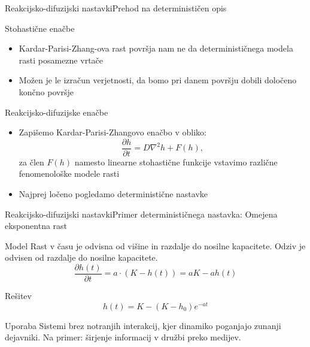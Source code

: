 \documentclass{beamer}
\begin{document}

\begin{frame}{Reakcijsko-difuzijski nastavki}{Prehod na determinističen opis}
\begin{block}{Stohastične enačbe}
  \begin{itemize}
  \item
    Kardar-Parisi-Zhang-ova rast površja nam ne da determinističnega modela rasti posamezne vrtače
  \item
    Možen je le izračun verjetnosti, da bomo pri danem površju dobili določeno končno površje
  \end{itemize}
\end{block}
\begin{block}{Reakcijsko-difuzijske enačbe}
  \begin{itemize}
  \item
    Zapišemo Kardar-Parisi-Zhangovo enačbo v obliko:
    \begin{equation} \frac{ \partial h}{ \partial t} = D \nabla^2 h + F(h), \end{equation}
    za člen $F(h)$ namesto linearne stohastične funkcije vstavimo različne fenomenološke modele rasti
  \item
    Najprej ločeno pogledamo deterministične nastavke
  \end{itemize}
\end{block}
\end{frame}


\begin{frame}{Reakcijsko-difuzijski nastavki}{Primer determinističnega nastavka: Omejena eksponentna rast}
\begin{block}{Model}
  Rast v času je odvisna od višine in razdalje do nosilne kapacitete. Odziv je odvisen od razdalje do nosilne kapacitete.
  \begin{equation} \frac{\partial h(t)}{\partial t} = a \cdot ( K - h(t) ) = a K - a h(t) \end{equation}
\end{block}
\begin{block}{Rešitev}
  \begin{equation} h(t) = K - (K - h_0) e^{-a t} \end{equation}
\end{block}
\begin{block}{Uporaba}
  Sistemi brez notranjih interakcij, kjer dinamiko poganjajo zunanji dejavniki. Na primer: širjenje informacij v družbi preko medijev.
\end{block}
\end{frame}
\end{document}
